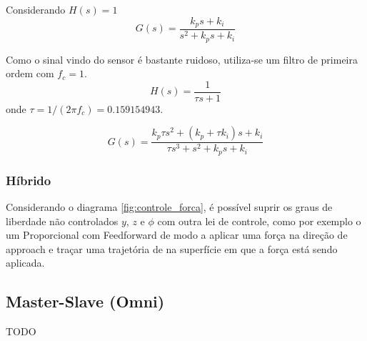 Considerando $H(s) = 1$
\begin{equation}
G(s) = \frac{k_p s + k_i}{s^2 + k_p s + k_i}
\end{equation}

Como o sinal vindo do sensor é bastante ruidoso, utiliza-se um filtro de primeira ordem com $f_c = 1$.
\begin{equation}
H(s) = \frac{1}{\tau s + 1}
\end{equation}
onde $\tau = 1/(2 \pi f_c) = 0.159154943$.

\begin{equation}
G(s) = \frac{k_p \tau s^2 + (k_p + \tau k_i)s + k_i}{\tau s^3 + s^2 + k_p s + k_i}
\end{equation}



\subsubsection{Híbrido}
Considerando o diagrama \ref{fig:controle_forca}, é possível suprir os graus de liberdade não controlados $y$, $z$ e $\phi$ com outra lei de controle, como por exemplo o um Proporcional com Feedforward de modo a aplicar uma força na direção de approach e traçar uma trajetória de na superfície em que a força está sendo aplicada. 


\subsection{Master-Slave (Omni)}
TODO

